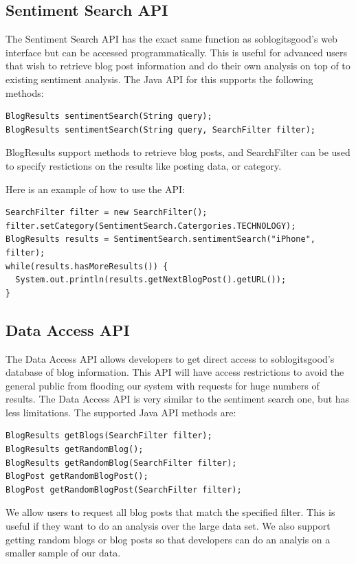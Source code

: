 \documentclass[titlepage]{article}
\begin{document}
\subsection{Sentiment Search API}
The Sentiment Search API has the exact same function as \textsf{soblogitsgood}'s web
interface but can be accessed programmatically.  This is useful for advanced
users that wish to retrieve blog post information and do their own analysis on
top of to existing sentiment analysis.  The Java API for this supports the
following methods:

\begin{verbatim}
BlogResults sentimentSearch(String query);
BlogResults sentimentSearch(String query, SearchFilter filter);
\end{verbatim}

BlogResults support methods to retrieve blog posts, and SearchFilter can be
used to specify restictions on the results like posting data, or category.

Here is an example of how to use the API:
\begin{verbatim}
SearchFilter filter = new SearchFilter();
filter.setCategory(SentimentSearch.Catergories.TECHNOLOGY);
BlogResults results = SentimentSearch.sentimentSearch("iPhone", filter);
while(results.hasMoreResults()) {
  System.out.println(results.getNextBlogPost().getURL());
}
\end{verbatim}

\subsection{Data Access API}
The Data Access API allows developers to get direct access to \textsf{soblogitsgood}'s
database of blog information.  This API will have access restrictions to avoid
the general public from flooding our system with requests for huge numbers of
results.  The Data Access API is very similar to the sentiment search one, but
has less limitations.  The supported Java API methods are:

\begin{verbatim}
BlogResults getBlogs(SearchFilter filter);
BlogResults getRandomBlog();
BlogResults getRandomBlog(SearchFilter filter);
BlogPost getRandomBlogPost();
BlogPost getRandomBlogPost(SearchFilter filter);
\end{verbatim}

We allow users to request all blog posts that match the specified filter.
This is useful if they want to do an analysis over the large data set.  We
also support getting random blogs or blog posts so that developers can do an
analyis on a smaller sample of our data.
\end{document}
